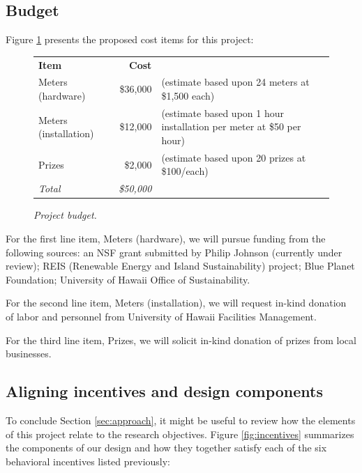 \documentclass[11pt]{article}
\begin{document}
\subsection{Budget}

Figure \ref{fig:budget} presents the proposed cost items for this project:

\begin{figure}[!ht]
\small
\begin{tabular}{lrl} \hline
{\bf Item }              & {\bf Cost }  & \\ 
Meters (hardware) & \$36,000 & (estimate based upon 24 meters at \$1,500 each) \\
Meters (installation) & \$12,000 & (estimate based upon 1 hour installation per meter at \$50 per hour) \\
Prizes                   & \$2,000 & (estimate based upon 20 prizes at \$100/each) \\ \hline 
{\em Total}          &  {\em \$50,000} & \\ \hline      
\end{tabular} 
\normalsize
\caption{{\em Project budget.}}
\label{fig:budget}
\end{figure}

For the first line item, Meters (hardware), we will pursue funding from the
following sources: an NSF grant submitted by Philip Johnson (currently
under review); REIS (Renewable Energy and Island Sustainability) project;
Blue Planet Foundation; University of Hawaii Office of Sustainability.

For the second line item, Meters (installation), we will request in-kind donation 
of labor and personnel from  University of Hawaii Facilities Management.

For the third line item, Prizes, we will solicit in-kind donation of prizes from
local businesses.




\subsection{Aligning incentives and design components}

To conclude Section \ref{sec:approach}, it might be useful to review how the
elements of this project relate to the research objectives.  Figure
\ref{fig:incentives} summarizes the components of our design and how they
together satisfy each of the six behavioral incentives listed previously:
\end{document}
